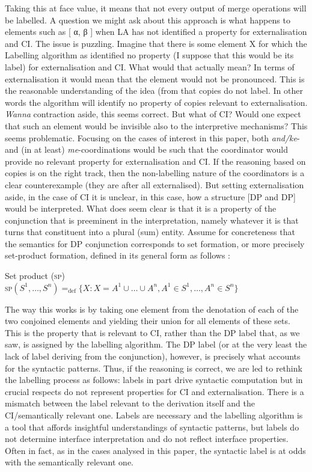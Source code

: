 \documentclass[output=paper]{langsci/langscibook}
\begin{document}
Taking this at face value, it means that not every output of merge operations
will be labelled. A question we might ask about this approach is what happens
to elements such as [ α, β ] when \gls{LA} has not identified a property for
externalisation and CI. The issue is puzzling. Imagine that there is some
element X for which the Labelling algorithm as identified no property (I
suppose that this would be its label) for externalisation and CI. What would
that actually mean? In terms of externalisation it would mean that the element
would not be pronounced. This is the reasonable understanding of the idea (from
\citet{Chomsky2015} that copies do not label. In other words the algorithm will
identify no property of copies relevant to externalisation. \emph{Wanna}
contraction aside, this seems correct. But what of CI? Would one expect that
such an element would be invisible also to the interpretive mechanisms? This
seems problematic. Focusing on the cases of interest in this paper, both
\emph{and/ke}- and (in  at least) \emph{me}-coordinations would be such
that the coordinator would provide no relevant property for externalisation and
CI. If the reasoning based on copies is on the right track, then the
non-labelling nature of the coordinators is a clear counterexample (they are
after all externalised). But setting externalisation aside, in the case of CI
it is unclear, in this case, how a structure [DP and DP] would be
interpreted. What does seem clear is that it is a property of the conjunction
that is preeminent in the interpretation, namely whatever it is that turns that
constituent into a plural (sum) entity. Assume for concreteness that the
semantics for DP conjunction corresponds to set formation, or more precisely
set-product formation, defined in its general form as follows
\citep[241]{heycock-zamparelli:05a}:

\ea\label{ex:29.53b}
    Set product \textsc{(sp)}\\
    \textsc{sp}$(S^1,\dots, S^n) =_{\text{def}} \{X:X=A^1\cup \dots \cup A^n, A^1 \in S^1,\dots, A^n \in S^n\}$
\z

The way this works is by taking one element from the denotation of each of the
two conjoined elements and yielding their union for all elements of these sets.
This is the property that is relevant to CI, rather than the DP label that, as
we saw, is assigned by the labelling algorithm. The DP label (or
at the very least the lack of label deriving from the conjunction), however, is
precisely what accounts for the syntactic patterns. Thus, if the reasoning is
correct, we are led to rethink the labelling process as follows:
labels in part drive syntactic computation but in crucial respects do not
represent properties for CI and externalisation. There is a mismatch between
the label relevant to the derivation itself and the CI/semantically relevant
one. Labels are necessary and the labelling algorithm is a tool
that affords insightful understandings of syntactic patterns, but labels do not
determine interface interpretation and do not reflect interface properties.
Often in fact, as in the cases analysed in this paper, the syntactic label is
at odds with the semantically relevant one.
\end{document}
